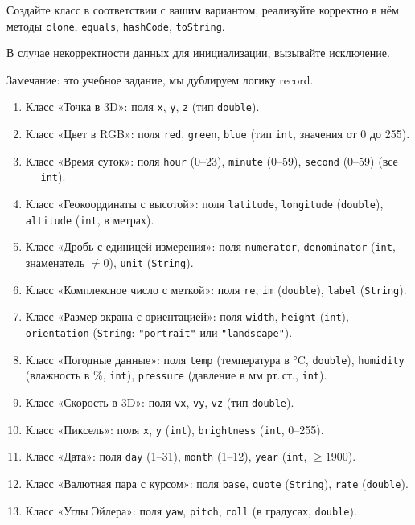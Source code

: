 \documentclass[12pt]{article}
\begin{document}
Создайте класс в соответствии с вашим вариантом, реализуйте корректно в нём
методы \texttt{clone}, \texttt{equals}, \texttt{hashCode}, \texttt{toString}.

В случае некорректности данных для инициализации, вызывайте исключение. 

Замечание: это учебное задание, мы дублируем логику record.

\begin{enumerate}
    \item Класс «Точка в 3D»: поля \texttt{x}, \texttt{y}, \texttt{z} (тип \texttt{double}).
    \item Класс «Цвет в RGB»: поля \texttt{red}, \texttt{green}, \texttt{blue} (тип \texttt{int}, значения от 0 до 255).
    \item Класс «Время суток»: поля \texttt{hour} (0–23), \texttt{minute} (0–59), \texttt{second} (0–59) (все — \texttt{int}).
    \item Класс «Геокоординаты с высотой»: поля \texttt{latitude}, \texttt{longitude} (\texttt{double}), \texttt{altitude} (\texttt{int}, в метрах).
    \item Класс «Дробь с единицей измерения»: поля \texttt{numerator}, \texttt{denominator} (\texttt{int}, знаменатель $\neq 0$), \texttt{unit} (\texttt{String}).
    \item Класс «Комплексное число с меткой»: поля \texttt{re}, \texttt{im} (\texttt{double}), \texttt{label} (\texttt{String}).
    \item Класс «Размер экрана с ориентацией»: поля \texttt{width}, \texttt{height} (\texttt{int}), \texttt{orientation} (\texttt{String}: \texttt{"portrait"} или \texttt{"landscape"}).
    \item Класс «Погодные данные»: поля \texttt{temp} (температура в °C, \texttt{double}), \texttt{humidity} (влажность в \%, \texttt{int}), \texttt{pressure} (давление в мм рт.\,ст., \texttt{int}).
    \item Класс «Скорость в 3D»: поля \texttt{vx}, \texttt{vy}, \texttt{vz} (тип \texttt{double}).
    \item Класс «Пиксель»: поля \texttt{x}, \texttt{y} (\texttt{int}), \texttt{brightness} (\texttt{int}, 0–255).
    \item Класс «Дата»: поля \texttt{day} (1–31), \texttt{month} (1–12), \texttt{year} (\texttt{int}, $\geq 1900$).
    \item Класс «Валютная пара с курсом»: поля \texttt{base}, \texttt{quote} (\texttt{String}), \texttt{rate} (\texttt{double}).
    \item Класс «Углы Эйлера»: поля \texttt{yaw}, \texttt{pitch}, \texttt{roll} (в градусах, \texttt{double}).

\end{enumerate}
\end{document}
